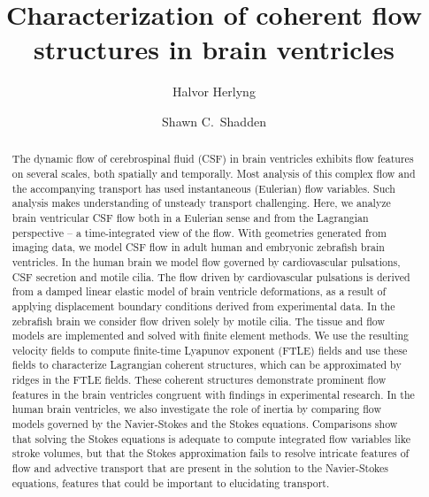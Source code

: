 \documentclass{template}
\title{\textbf{Characterization of coherent flow structures in brain ventricles}}
\author[1,*,\textdagger]{Halvor Herlyng}
\author[2]{Shawn C.~Shadden}
\affil[1]{Department of Numerical Analysis and Scientific Computing, Simula Research Laboratory, Oslo, Norway}
\affil[2]{Department of Mechanical Engineering, University of California, 6149 Etcheverry Hall, CA 94720-1740 Berkeley, USA}
\affil[*]{Corresponding author}
\date{\vspace{-2em}} %
\begin{document}
\maketitle

\begin{abstract}
    The dynamic flow of cerebrospinal fluid (CSF) in brain ventricles 
    exhibits flow features on several scales, both spatially and temporally.
    Most analysis of this complex flow and the accompanying transport
    has used instantaneous (Eulerian) flow variables. Such analysis
    makes understanding of unsteady transport challenging.
    Here, we analyze brain ventricular CSF flow both in a Eulerian
    sense and from the Lagrangian perspective -- a time-integrated view of the flow.
    With geometries generated from imaging data, we model CSF flow
    in adult human and embryonic zebrafish brain ventricles. 
    In the human brain we model flow governed by cardiovascular pulsations,
    CSF secretion and motile cilia. 
    The flow driven by cardiovascular pulsations is derived from a damped linear elastic model
    of brain ventricle deformations, as a result of applying displacement boundary
    conditions derived from experimental data.
    In the zebrafish brain we consider flow driven solely by motile cilia.
    The tissue and flow models are implemented and solved with finite element methods.
    We use the resulting velocity fields to compute finite-time Lyapunov exponent (FTLE)
    fields and use these fields to characterize Lagrangian coherent structures,
    which can be approximated by ridges in the FTLE fields.
    These coherent structures demonstrate prominent flow features in the brain ventricles
    congruent with findings in experimental research. In the human brain ventricles, we also 
    investigate the role of inertia by comparing flow models governed by 
    the Navier-Stokes and the Stokes equations. Comparisons show that
    solving the Stokes equations is adequate to compute integrated flow
    variables like stroke volumes, but that the Stokes approximation fails 
    to resolve intricate features of flow and advective transport that
    are present in the solution to the Navier-Stokes equations,
    features that could be important to elucidating transport.
\end{abstract}

\begingroup
  \renewcommand{\thefootnote}{\textdagger}
\endgroup
\end{document}

